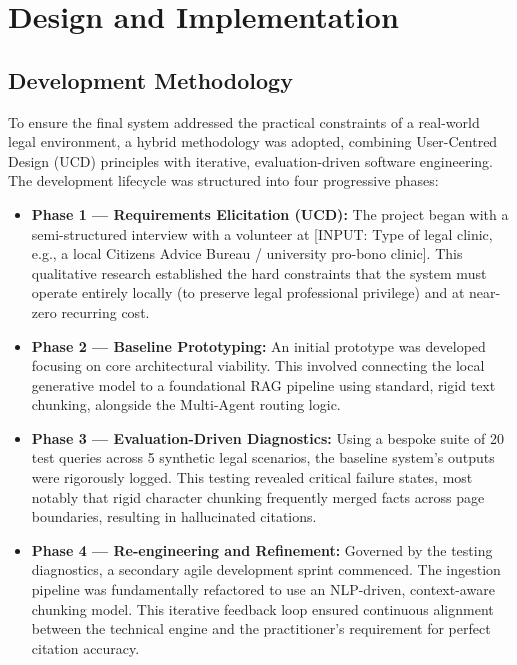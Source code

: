 \documentclass[11pt,a4paper]{article}
\begin{document}
\section{Design and Implementation}
\label{sec:implementation}

\subsection{Development Methodology}

To ensure the final system addressed the practical constraints of a real-world legal environment, a hybrid methodology was adopted, combining User-Centred Design (UCD) principles with iterative, evaluation-driven software engineering. The development lifecycle was structured into four progressive phases:

\begin{itemize}
    \item \textbf{Phase 1 --- Requirements Elicitation (UCD):} The project began with a semi-structured interview with a volunteer at [INPUT: Type of legal clinic, e.g., a local Citizens Advice Bureau / university pro-bono clinic]. This qualitative research established the hard constraints that the system must operate entirely locally (to preserve legal professional privilege) and at near-zero recurring cost.
    \item \textbf{Phase 2 --- Baseline Prototyping:} An initial prototype was developed focusing on core architectural viability. This involved connecting the local generative model to a foundational RAG pipeline using standard, rigid text chunking, alongside the Multi-Agent routing logic.
    \item \textbf{Phase 3 --- Evaluation-Driven Diagnostics:} Using a bespoke suite of 20 test queries across 5 synthetic legal scenarios, the baseline system's outputs were rigorously logged. This testing revealed critical failure states, most notably that rigid character chunking frequently merged facts across page boundaries, resulting in hallucinated citations.
    \item \textbf{Phase 4 --- Re-engineering and Refinement:} Governed by the testing diagnostics, a secondary agile development sprint commenced. The ingestion pipeline was fundamentally refactored to use an NLP-driven, context-aware chunking model. This iterative feedback loop ensured continuous alignment between the technical engine and the practitioner's requirement for perfect citation accuracy.
\end{itemize}
\end{document}
